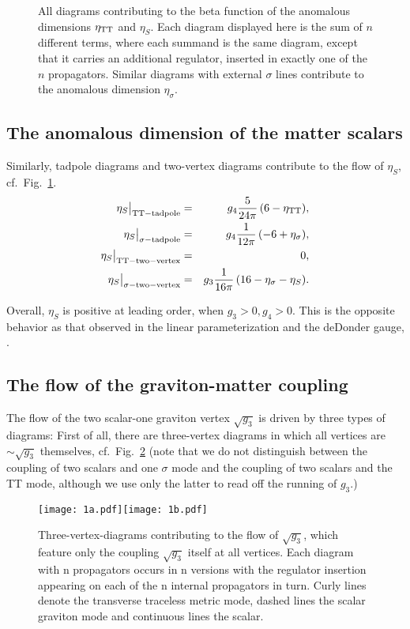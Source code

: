 \documentclass[11pt]{book} %
\newcommand{\bea}{\begin{eqnarray}}
\newcommand{\eea}{\end{eqnarray}}
\numberwithin{equation}{chapter}
\begin{document}
\begin{figure}
  \begin{center}
    
  \end{center}
  \caption{
    All diagrams contributing to the beta function of the anomalous dimensions
    $\eta_{\rm TT}$ and $\eta_S$.
    Each diagram displayed here is the sum of $n$ different terms, where each summand
    is the same diagram, except that it carries an additional regulator,
    inserted in exactly one of the $n$ propagators.
    Similar diagrams with external $\sigma$ lines contribute to the
    anomalous dimension $\eta_{\sigma}$.
  }
  \label{fig:eta-diagrams-ch4}
\end{figure}


\subsection{The anomalous dimension of the matter scalars}

Similarly, tadpole diagrams and two-vertex diagrams contribute to the flow of $\eta_S$,
cf.~Fig.~\ref{fig:eta-diagrams-ch4}.
\bea
\eta_S\big|_{\rm TT-tadpole} &= &g_4\frac{5}{24\pi}\,(6-\eta_{\rm TT}), \label{etaS1}\\
\eta_S\big|_{\sigma- \rm tadpole} &= & g_4\frac{1}{12 \pi} \, (-6+\eta_{\sigma}),\label{etaS2}\\
\eta_S\big|_{\rm TT-two-vertex} &=& 0, \\
\eta_S\big|_{\sigma-\rm two-vertex} &=& g_3\frac{1}{16\pi} \, (16-\eta_{\sigma}-\eta_S)\label{etaS3}.
\eea

Overall, $\eta_S$ is positive at leading order, when $g_3>0, g_4>0$.
This is the opposite behavior as that observed in the linear parameterization
and the deDonder gauge, \cite{Dona:2013qba}.


\subsection{The flow of the graviton-matter coupling}

The flow of the two scalar-one graviton vertex
$\sqrt{g_3}$ is driven by three types of diagrams:
First of all, there are three-vertex diagrams in which all vertices are $\sim \sqrt{g_3}$ themselves,
cf.~Fig.~\ref{threevertexdiagsg3} (note that we do not distinguish between the coupling of two
scalars and one $\sigma$ mode and the coupling of two scalars and the TT mode,
although we use only the latter to read off the running of $g_3$.)
\begin{figure}
\texttt{[image: 1a.pdf]}\quad \texttt{[image: 1b.pdf]}\newline
\caption{\label{threevertexdiagsg3} Three-vertex-diagrams contributing to the flow of $\sqrt{g_3}$,
which feature only the coupling $\sqrt{g_3}$ itself at all vertices.
Each diagram with n propagators occurs in n versions with the regulator insertion appearing on each
of the n internal propagators in turn.
Curly lines denote the transverse traceless metric mode,
dashed lines the scalar graviton mode and continuous lines the scalar. }
\end{figure}
\end{document}
